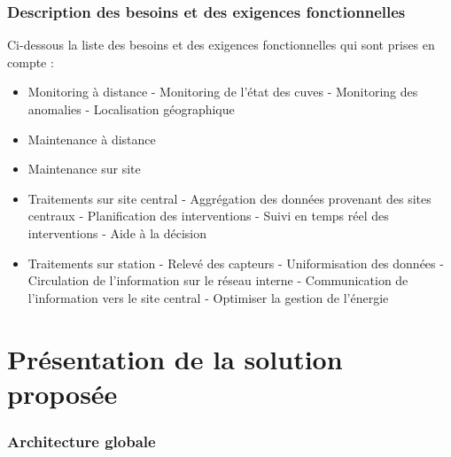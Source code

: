 \documentclass[a4paper]{article}
\begin{document}
\section{Description des besoins et des exigences fonctionnelles}

Ci-dessous la liste des besoins et des exigences fonctionnelles qui sont prises en compte :

\begin{itemize}
\item Monitoring à distance - Monitoring de l'état des cuves - Monitoring des anomalies - Localisation géographique
\item Maintenance à distance
\item Maintenance sur site
\item Traitements sur site central - Aggrégation des données provenant des sites centraux - Planification des interventions - Suivi en temps réel des interventions - Aide à la décision
\item Traitements sur station - Relevé des capteurs - Uniformisation des données - Circulation de l'information sur le réseau interne - Communication de l'information vers le site central - Optimiser la gestion de l'énergie
\end{itemize}

\part{Présentation de la solution proposée}

\section{Architecture globale}
\end{document}
